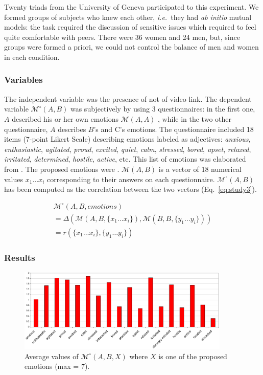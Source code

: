 \documentclass[twocolumn]{article}
\newcommand{\ie}{{\textit{i.e.\ }}}
\newcommand{\M}[3]{{\mathcal{M}(#1, #2, #3)}}
\newcommand{\gmodel}[2]{{$\mathcal{M}(#1, #2)$}}
\newcommand{\Model}[3]{{$\mathcal{M}^{\circ}(#1, #2, #3)$}}
\newcommand{\gModel}[2]{{$\mathcal{M}^{\circ}(#1, #2)$}}
\newcommand{\Mdeg}[3]{{\mathcal{M}^{\circ}(#1, #2, #3)}}
\begin{document}
Twenty triads from the University of Geneva participated to this experiment. We
formed groups of subjects who knew each other, \ie they had \emph{ab initio}
mutual models: the task required the discussion of sensitive issues which
required to feel quite comfortable with peers. There were 36 women and 24 men,
but, since groups were formed a priori, we could not control the balance of men
and women in each condition.

\subsubsection*{Variables}

The independent variable was the presence of not of video link. The dependent
variable \gModel{A}{B} was subjectively by using 3 questionnaires: in the first
one, $A$ described his or her own emotions \gmodel{A}{A} , while in the two other
questionnaire, $A$ describes $B$'s and C's emotions. The questionnaire included 18
items (7-point Likert Scale) describing emotions labeled as adjectives:
\emph{anxious}, \emph{enthusiastic}, \emph{agitated}, \emph{proud},
\emph{excited}, \emph{quiet}, \emph{calm}, \emph{stressed}, \emph{bored},
\emph{upset}, \emph{relaxed}, \emph{irritated}, \emph{determined},
\emph{hostile}, \emph{active}, etc. This list of emotions was
elaborated from . The proposed emotions were . \gmodel{A}{B} is a vector
of 18 numerical values ${x_1 \dots x_i}$ corresponding to their answers on each
questionnaire. \gModel{A}{B} has been computed as the correlation between the
two vectors (Eq.~\ref{eq:study3}).

\begin{multline} \label{eq:study3}
    \Mdeg{A}{B}{emotions}\\
    = \Delta(\M{A}{B}{\{x_1 \dots x_i\}}, \M{B}{B}{\{y_1 \dots y_i\}}) \\ 
    = r(\{x_1 \dots x_i\}, \{y_1 \dots y_i\})
\end{multline}

\subsubsection*{Results}

\begin{figure}[ht!]
        \centering
        \includegraphics[width=0.9\textwidth]{image9.pdf}
        \caption{Average values of \Model{A}{B}{X} where $X$ is one of the proposed
        emotions (max = 7).}
        \label{study3:deg_m_values}
\end{figure}
\end{document}
